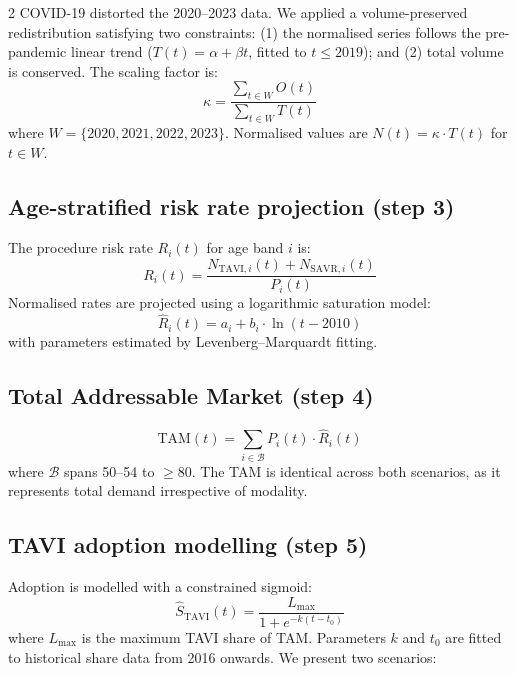 \documentclass[10pt, a4paper]{article}
\begin{document}
\begin{multicols}{2}
COVID-19 distorted the 2020--2023 data. We applied a volume-preserved redistribution satisfying two constraints: (1) the normalised series follows the pre-pandemic linear trend ($T(t) = \alpha + \beta t$, fitted to $t \leq 2019$); and (2) total volume is conserved. The scaling factor is:
%
\begin{equation}
\kappa = \frac{\sum_{t \in W} O(t)}{\sum_{t \in W} T(t)}
\end{equation}
%
where $W = \{2020, 2021, 2022, 2023\}$. Normalised values are $N(t) = \kappa \cdot T(t)$ for $t \in W$.

\subsection{Age-stratified risk rate projection (step 3)}

The procedure risk rate $R_i(t)$ for age band $i$ is:
%
\begin{equation}
R_i(t) = \frac{N_{\mathrm{TAVI},i}(t) + N_{\mathrm{SAVR},i}(t)}{P_i(t)}
\end{equation}
%
Normalised rates are projected using a logarithmic saturation model:
%
\begin{equation}
\hat{R}_i(t) = a_i + b_i \cdot \ln(t - 2010)
\end{equation}
%
with parameters estimated by Levenberg--Marquardt fitting.

\subsection{Total Addressable Market (step 4)}

%
\begin{equation}
\mathrm{TAM}(t) = \sum_{i \in \mathcal{B}} P_i(t) \cdot \hat{R}_i(t)
\end{equation}
%
where $\mathcal{B}$ spans 50--54 to $\geq$80. The TAM is identical across both scenarios, as it represents total demand irrespective of modality.

\subsection{TAVI adoption modelling (step 5)}

Adoption is modelled with a constrained sigmoid:
%
\begin{equation}
\hat{S}_{\mathrm{TAVI}}(t) = \frac{L_{\max}}{1 + e^{-k(t - t_0)}}
\end{equation}
%
where $L_{\max}$ is the maximum TAVI share of TAM. Parameters $k$ and $t_0$ are fitted to historical share data from 2016 onwards. We present two scenarios:


\end{multicols}
\end{document}
